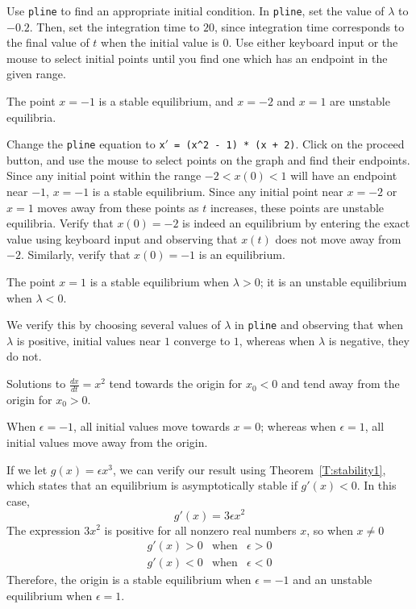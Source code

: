 \soln Use {\tt pline} to find an appropriate initial condition.
In {\tt pline}, set the value of $\lambda$ to $-0.2$.  Then, set the
integration time to $20$, since integration time corresponds to the
final value of $t$ when the initial value is $0$.  Use either
keyboard input or the mouse to select initial points until you
find one which has an endpoint in the given range. 

\ans The point $x = -1$ is a stable equilibrium, and $x = -2$ and $x = 1$
are unstable equilibria.

\soln Change the {\tt pline} equation to
{\tt x$'$ = (x\^{}2 - 1) * (x + 2)}.  Click on the proceed button, and
use the mouse to select points on the graph and find their endpoints. 
Since any initial point within the range $-2 < x(0) < 1$ will have an
endpoint near $-1$, $x = -1$ is a stable equilibrium.  Since any initial
point near $x = -2$ or $x = 1$ moves away from these points as $t$
increases, these points are unstable equilibria.  Verify that $x(0)
= -2$ is indeed an equilibrium by entering the exact value using
keyboard input and observing that $x(t)$ does not move away from
$-2$.  Similarly, verify that $x(0) = -1$ is an equilibrium.

\ans The point $x = 1$ is a stable equilibrium when $\lambda > 0$; it is
an unstable equilibrium when $\lambda < 0$. 

\soln We verify this by choosing several values of $\lambda$ in
{\tt pline} and observing that when $\lambda$ is positive, initial values
near $1$ converge to $1$, whereas when $\lambda$ is negative, they do not.

Solutions to $\frac{dx}{dt} = x^2$ tend towards the origin for $x_0 < 0$
and tend away from the origin for $x_0 > 0$.

\ans When $\epsilon = -1$, all initial values move towards $x = 0$; whereas
when $\epsilon = 1$, all initial values move away from the origin. 

\soln If we let $g(x) = \epsilon x^3$, we can verify our result using
Theorem~\ref{T:stability1}, which states
that an equilibrium is asymptotically stable if $g'(x) < 0$.  In this case,
\[
g'(x) = 3\epsilon x^2
\]
The expression $3x^2$ is positive for all nonzero real numbers $x$, so
when $x \neq 0$
\[ \begin{array}{ccc}
g'(x) > 0 & \mbox{when} & \epsilon > 0 \\
g'(x) < 0 & \mbox{when} & \epsilon < 0 \end{array}
\]
Therefore, the origin is a stable equilibrium when $\epsilon = -1$ and
an unstable equilibrium when $\epsilon = 1$.

